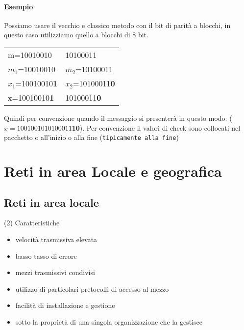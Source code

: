 \documentclass{book}
\begin{document}
\subsubsection{Esempio}
Possiamo usare il vecchio e classico metodo con il bit di parità a blocchi, in
questo caso utilizziamo quello a blocchi di 8 bit.
\begin{center}
	\begin{tabular}{ll}
		m=10010010&10100011\\
		$m_1$=10010010&$m_2$=10100011\\
		$x_1$=10010010{\bf\color{red}1}&$x_2$=10100011{\bf\color{red}0}\\
		x=10010010{\bf\color{red}1}&10100011{\bf\color{red}0}
	\end{tabular}
\end{center}
Quindi per convenzione quando il messaggio si presenterà in questo modo:
($x=1001001010100011${\bf\color{red}10}). Per convenzione il valori di check
sono collocati nel pacchetto o all'inizio o alla fine (\texttt{tipicamente alla
fine})
\chapter{Reti in area Locale e geografica}
\section{Reti in area locale}
\begin{tasks}(2)
	\task Caratteristiche
	\begin{itemize}
		\item velocità trasmissiva elevata
		\item basso tasso di errore
		\item mezzi trasmissivi condivisi
		\item utilizzo di particolari pretocolli di accesso al mezzo
		\item facilità di installazione e gestione
		\item sotto la proprietà di una singola organizzazione che la gestisce
	\end{itemize}
\end{tasks}
\end{document}
